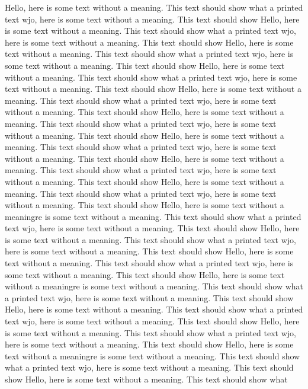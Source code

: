 \documentclass{article}
\begin{document}
\begin{multicols}{3}
Hello, here is some text without a meaning.  This text should show what 
a printed text wjo, here is some text without a meaning.  This text should show 
Hello, here is some text without a meaning.  This text should show what 
a printed text wjo, here is some text without a meaning.  This text should show 
Hello, here is some text without a meaning.  This text should show what 
a printed text wjo, here is some text without a meaning.  This text should show 
Hello, here is some text without a meaning.  This text should show what 
a printed text wjo, here is some text without a meaning.  This text should show 
Hello, here is some text without a meaning.  This text should show what 
a printed text wjo, here is some text without a meaning.  This text should show 
Hello, here is some text without a meaning.  This text should show what 
a printed text wjo, here is some text without a meaning.  This text should show 
Hello, here is some text without a meaning.  This text should show what 
a printed text wjo, here is some text without a meaning.  This text should show 
Hello, here is some text without a meaning.  This text should show what 
a printed text wjo, here is some text without a meaning.  This text should show 
Hello, here is some text without a meaning.  This text should show what 
a printed text wjo, here is some text without a meaning.  This text should show 
Hello, here is some text without a meaningre is some text without a meaning.  This text should show what 
a printed text wjo, here is some text without a meaning.  This text should show 
Hello, here is some text without a meaning.  This text should show what 
a printed text wjo, here is some text without a meaning.  This text should show 
Hello, here is some text without a meaning.  This text should show what 
a printed text wjo, here is some text without a meaning.  This text should show 
Hello, here is some text without a meaningre is some text without a meaning.  This text should show what 
a printed text wjo, here is some text without a meaning.  This text should show 
Hello, here is some text without a meaning.  This text should show what 
a printed text wjo, here is some text without a meaning.  This text should show 
Hello, here is some text without a meaning.  This text should show what 
a printed text wjo, here is some text without a meaning.  This text should show 
Hello, here is some text without a meaningre is some text without a meaning.  This text should show what 
a printed text wjo, here is some text without a meaning.  This text should show 
Hello, here is some text without a meaning.  This text should show what 

\end{multicols}
\end{document}

